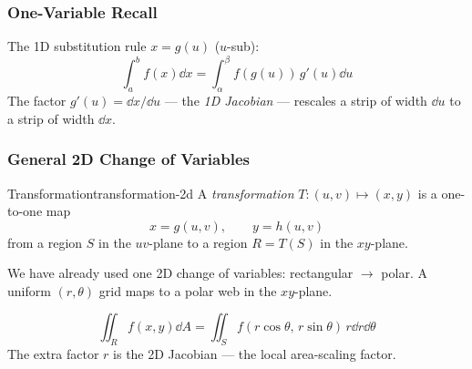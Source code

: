 \subsubsection{One-Variable Recall}

The 1D substitution rule $x = g(u)$ ($u$-sub):
\[
  \int_a^b f(x)\dd{x} = \int_\alpha^\beta f(g(u))\,g'(u)\dd{u}
\]
The factor $g'(u) = \dd{x}/\dd{u}$ --- the \emph{1D Jacobian} --- rescales a strip of width $\dd{u}$ to a strip of width $\dd{x}$.

\subsubsection{General 2D Change of Variables}

\begin{definition}{Transformation}{transformation-2d}
  A \emph{transformation} $T\colon (u,v) \mapsto (x,y)$ is a one-to-one map
  \[
    x = g(u,v),\qquad y = h(u,v)
  \]
  from a region $S$ in the $uv$-plane to a region $R = T(S)$ in the $xy$-plane.
\end{definition}

\begin{example}

  We have already used one 2D change of variables: rectangular $\to$ polar. A uniform $(r,\theta)$ grid maps to a polar web in the $xy$-plane.

  \begin{center}
    \hspace{0.4cm}
    \hspace{0.4cm}
  \end{center}

  \[
    \iint_R f(x,y)\dd{A}
    = \iint_S f(r\cos\theta,\, r\sin\theta)\,r\dd{r}\dd{\theta}
  \]
  The extra factor $r$ is the 2D Jacobian --- the local area-scaling factor.

\end{example}

